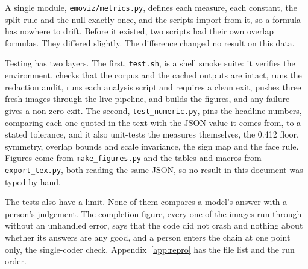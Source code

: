 A single module, \texttt{emoviz/metrics.py}, defines each measure, each constant, the split rule and the null exactly once, and the scripts import from it, so a formula has nowhere to drift. Before it existed, two scripts had their own overlap formulas. They differed slightly. The difference changed no result on this data.

Testing has two layers. The first, \texttt{test.sh}, is a shell smoke suite: it verifies the environment, checks that the corpus and the cached outputs are intact, runs the redaction audit, runs each analysis script and requires a clean exit, pushes three fresh images through the live pipeline, and builds the figures, and any failure gives a non-zero exit. The second, \texttt{test\_numeric.py}, pins the headline numbers, comparing each one quoted in the text with the JSON value it comes from, to a stated tolerance, and it also unit-tests the measures themselves, the 0.412 floor, symmetry, overlap bounds and scale invariance, the sign map and the face rule. Figures come from \texttt{make\_figures.py} and the tables and macros from \texttt{export\_tex.py}, both reading the same JSON, so no result in this document was typed by hand.

The tests also have a limit. None of them compares a model's answer with a person's judgement. The completion figure, every one of the \nTotal{} images run through without an unhandled error, says that the code did not crash and nothing about whether its answers are any good, and a person enters the chain at one point only, the single-coder check. Appendix~\ref{app:repro} has the file list and the run order.

